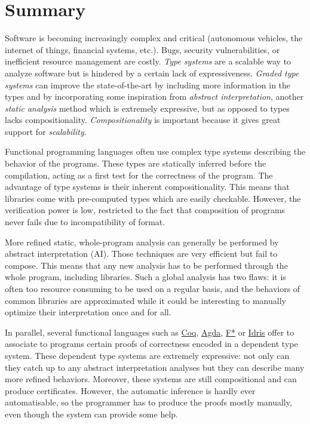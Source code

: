 \documentclass{article}[11pt]
\begin{document}
\vspace{15cm}



\newpage


\section{Summary}

Software is becoming increasingly complex and critical (autonomous vehicles, the internet of things, financial systems, etc.). Bugs, security vulnerabilities, or inefficient resource management are costly. {\em Type systems} are a scalable way to analyze software but is hindered by a certain lack of expressiveness. {\em Graded type systems} can improve the state-of-the-art by including more information in the types and by incorporating some inspiration from {\em abstract interpretation}, another {\em static analysis} method which is extremely expressive, but as opposed to types lacks compositionality. {\em Compositionality} is important because it gives great support for {\em scalability}.

Functional programming languages often use complex type systems describing the behavior of the programs. These types are statically inferred before the compilation, acting as a first test for the correctness of the program. The advantage of type systems is their inherent compositionality. This means that libraries come with pre-computed types which are easily checkable. However, the verification power is low, restricted to the fact that composition of programs never fails due to incompatibility of format.

More refined static, whole-program analysis can generally be performed by abstract interpretation (AI). Those techniques are very efficient but fail to compose. This means that any new analysis has to be performed through the whole program, including libraries. Such a global analysis has two flaws: it is often too resource consuming to be used on a regular basis, and the behaviors of common libraries are approximated while it could be interesting to manually optimize their interpretation once and for all.

In parallel, several functional languages such as \href{https://coq.inria.fr/}{Coq}, \href{http://wiki.portal.chalmers.se/agda/pmwiki.php}{Agda}, \href{https://www.fstar-lang.org/}{F*} or \href{http://www.idris-lang.org/}{Idris} offer to associate to programs certain proofs of correctness encoded in a dependent type system. These dependent type systems are extremely expressive: not only can they catch up to any abstract interpretation analyses but they can describe many more refined behaviors. Moreover, these systems are still compositional and can produce certificates. However, the automatic inference is hardly ever automatisable, so the programmer has to produce the proofs mostly manually, even though the system can provide some help.
\end{document}
